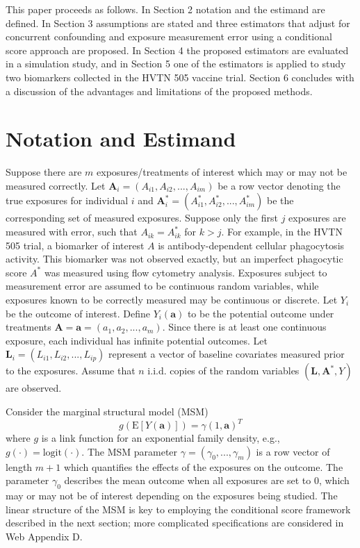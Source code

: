\documentclass[useAMS,usenatbib,referee]{biom}
\begin{document}
This paper proceeds as follows. In Section 2 notation and the estimand are defined. In Section 3 assumptions are stated and three estimators that adjust for concurrent confounding and exposure measurement error using a conditional score approach are proposed. In Section 4 the proposed estimators are evaluated in a simulation study, and in Section 5 one of the estimators is applied to study two biomarkers collected in the HVTN 505 vaccine trial. Section 6 concludes with a discussion of the advantages and limitations of the proposed methods.

\section{Notation and Estimand}
\label{s:notation}

Suppose there are $m$ exposures/treatments of interest which may or may not be measured correctly. Let $\bm{A}_{i} = (A_{i1}, A_{i2}, ..., A_{im})$ be a row vector denoting the true exposures for individual $i$ and $\bm{A}^{*}_{i} =  (A^{*}_{i1}, A^{*}_{i2}, ..., A^{*}_{im})$ be the corresponding set of measured exposures. Suppose only the first $j$ exposures are measured with error, such that $A_{ik} = A^{*}_{ik}$ for $k > j$. For example, in the HVTN 505 trial, a biomarker of interest $A$ is antibody-dependent cellular phagocytosis activity. This biomarker was not observed exactly, but an imperfect phagocytic score $A^{*}$ was measured using flow cytometry analysis. Exposures subject to measurement error are assumed to be continuous random variables, while exposures known to be correctly measured may be continuous or discrete. Let $Y_{i}$ be the outcome of interest. Define $Y_{i}(\bm{a})$ to be the potential outcome under treatments $\bm{A} = \bm{a} = (a_{1}, a_{2}, ..., a_{m})$. Since there is at least one continuous exposure, each individual has infinite potential outcomes. Let $\bm{L}_{i} =  (L_{i1}, L_{i2}, ..., L_{ip})$ represent a vector of baseline covariates measured prior to the exposures. Assume that $n$ i.i.d. copies of the random variables $(\bm{L}, \bm{A}^{*}, Y)$ are observed.

Consider the marginal structural model (MSM)
\begin{equation}
    g(\text{E}[Y(\bm{a})]) = \gamma (1, \bm{a})^{T}
\end{equation}
where $g$ is a link function for an exponential family density, e.g., $g(\cdot) = \text{logit}(\cdot)$. The MSM parameter $\gamma = (\gamma_{0}, ..., \gamma_{m})$ is a row vector of length $m+1$ which quantifies the effects of the exposures on the outcome. The parameter $\gamma_{0}$ describes the mean outcome when all exposures are set to 0, which may or may not be of interest depending on the exposures being studied. The linear structure of the MSM is key to employing the conditional score framework described in the next section; more complicated specifications are considered in Web Appendix D.
\end{document}
